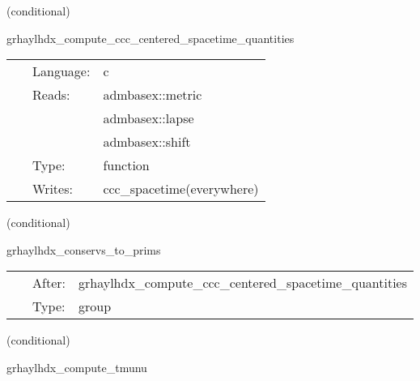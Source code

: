 \vspace{5mm}

   (conditional) 

\hspace{5mm} grhaylhdx\_compute\_ccc\_centered\_spacetime\_quantities 

\hspace{5mm}{\it interpolate spacetime quantities to cell centers } 


\hspace{5mm}

 \begin{tabular*}{160mm}{cll} 
~ & Language:  & c \\ 
~ & Reads:  & admbasex::metric \\ 
~& ~ &admbasex::lapse\\ 
~& ~ &admbasex::shift\\ 
~ & Type:  & function \\ 
~ & Writes:  & ccc\_spacetime(everywhere) \\ 
\end{tabular*} 


\vspace{5mm}

   (conditional) 

\hspace{5mm} grhaylhdx\_conservs\_to\_prims 

\hspace{5mm}{\it compute primitive variables from conservatives } 


\hspace{5mm}

 \begin{tabular*}{160mm}{cll} 
~ & After:  & grhaylhdx\_compute\_ccc\_centered\_spacetime\_quantities \\ 
~ & Type:  & group \\ 
\end{tabular*} 


\vspace{5mm}

   (conditional) 

\hspace{5mm} grhaylhdx\_compute\_tmunu 

\hspace{5mm}{\it compute stress-energy tensor and interpolate to vertices } 


\hspace{5mm}

